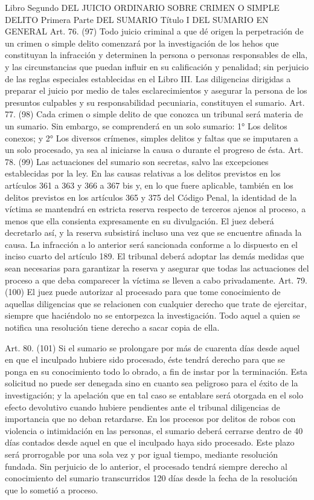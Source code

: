     Libro Segundo
    DEL JUICIO ORDINARIO SOBRE CRIMEN O SIMPLE DELITO
    Primera Parte
    DEL SUMARIO
    Título I
    DEL SUMARIO EN GENERAL
    Art. 76. (97) Todo juicio criminal a que dé origen la perpetración de un crimen o simple delito comenzará por la investigación de los hehos que constituyan la infracción y determinen la persona o personas responsables de ella, y las circunstancias que puedan influir en su calificación y penalidad; sin perjuicio de las reglas especiales establecidas en el Libro III.
    Las diligencias dirigidas a preparar el juicio por medio de tales esclarecimientos y asegurar la persona de los presuntos culpables y su responsabilidad pecuniaria, constituyen el sumario.
    Art. 77. (98) Cada crimen o simple delito de que conozca un tribunal será materia de un sumario.
    Sin embargo, se comprenderá en un solo sumario:
    1° Los delitos conexos; y
    2° Los diversos crímenes, simples delitos y faltas que se imputaren a un solo procesado, ya sea al iniciarse la causa o durante el progreso de ésta.
    Art. 78. (99) Las actuaciones del sumario son secretas, salvo las excepciones establecidas por la ley. En las causas relativas a los delitos previstos en los artículos 361 a 363 y 366 a 367 bis y, en lo que fuere aplicable, también en los delitos previstos en los artículos 365 y 375 del Código Penal, la identidad de la víctima se mantendrá en estricta reserva respecto de terceros ajenos al proceso, a menos que ella consienta expresamente en su divulgación. El juez deberá decretarlo así, y la reserva subsistirá incluso una vez que se encuentre afinada la causa. La infracción a lo anterior será sancionada conforme a lo dispuesto en el inciso cuarto del artículo 189. El tribunal deberá adoptar las demás medidas que sean necesarias para garantizar la reserva y asegurar que todas las actuaciones del proceso a que deba comparecer la víctima se lleven a cabo privadamente.
    Art. 79. (100) El juez puede autorizar al procesado para que tome conocimiento de aquellas diligencias que se relacionen con cualquier derecho que trate de ejercitar, siempre que haciéndolo no se entorpezca la investigación.
    Todo aquel a quien se notifica una resolución tiene derecho a sacar copia de ella.


    Art. 80. (101) Si el sumario se prolongare por más de cuarenta días desde aquel en que el inculpado hubiere sido procesado, éste tendrá derecho para que se ponga en su conocimiento todo lo obrado, a fin de instar por la terminación. Esta solicitud no puede ser denegada sino en cuanto sea peligroso para el éxito de la investigación; y la apelación que en tal caso se entablare será otorgada en el solo efecto devolutivo cuando hubiere pendientes ante el tribunal diligencias de importancia que no deban retardarse.
    En los procesos por delitos de robos con violencia o intimidación en las personas, el sumario deberá cerrarse dentro de 40 días contados desde aquel en que el inculpado haya sido procesado. Este plazo será prorrogable por una sola vez y por igual tiempo, mediante resolución fundada. Sin perjuicio de lo anterior, el procesado tendrá siempre derecho al conocimiento del sumario transcurridos 120 días desde la fecha de la resolución que lo sometió a proceso.




